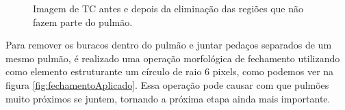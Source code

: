 \begin{figure}[ht]
 \begin{center}
 \end{center}
 \caption{Imagem de TC antes e depois da eliminação das regiões que não fazem parte do pulmão.}
 \label{fig:clean}
\end{figure}

Para remover os buracos dentro do pulmão e juntar pedaços separados de um mesmo pulmão, é realizado uma operação morfológica de fechamento utilizando como elemento estruturante um círculo de raio 6 pixels, como podemos ver na figura \ref{fig:fechamentoAplicado}. Essa operação pode causar com que pulmões muito próximos se juntem, tornando a próxima etapa ainda mais importante.

